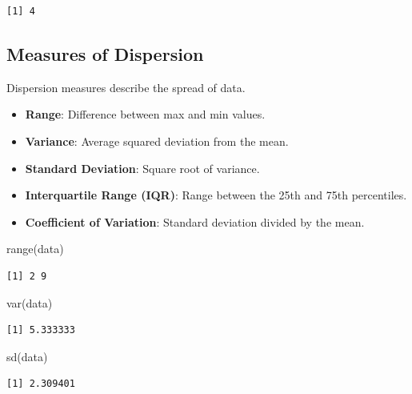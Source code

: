 \documentclass[
  man,
  floatsintext,
  longtable,
  nolmodern,
  notxfonts,
  notimes,
  colorlinks=true,linkcolor=blue,citecolor=blue,urlcolor=blue]{apa7}
\newenvironment{Shaded}{\begin{snugshade}}{\end{snugshade}}
\newcommand{\FunctionTok}[1]{\textcolor[rgb]{0.28,0.35,0.67}{#1}}
\newcommand{\NormalTok}[1]{\textcolor[rgb]{0.00,0.23,0.31}{#1}}
\begin{document}
\begin{verbatim}
[1] 4
\end{verbatim}

\subsection{Measures of Dispersion}\label{measures-of-dispersion}

Dispersion measures describe the spread of data.

\begin{itemize}
\item
  \textbf{Range}: Difference between max and min values.
\item
  \textbf{Variance}: Average squared deviation from the mean.
\item
  \textbf{Standard Deviation}: Square root of variance.
\item
  \textbf{Interquartile Range (IQR)}: Range between the 25th and 75th
  percentiles.
\item
  \textbf{Coefficient of Variation}: Standard deviation divided by the
  mean.
\end{itemize}

\begin{Shaded}
\begin{Highlighting}[]
\FunctionTok{range}\NormalTok{(data)}
\end{Highlighting}
\end{Shaded}

\begin{verbatim}
[1] 2 9
\end{verbatim}

\begin{Shaded}
\begin{Highlighting}[]
\FunctionTok{var}\NormalTok{(data)}
\end{Highlighting}
\end{Shaded}

\begin{verbatim}
[1] 5.333333
\end{verbatim}

\begin{Shaded}
\begin{Highlighting}[]
\FunctionTok{sd}\NormalTok{(data)}
\end{Highlighting}
\end{Shaded}

\begin{verbatim}
[1] 2.309401
\end{verbatim}
\end{document}
